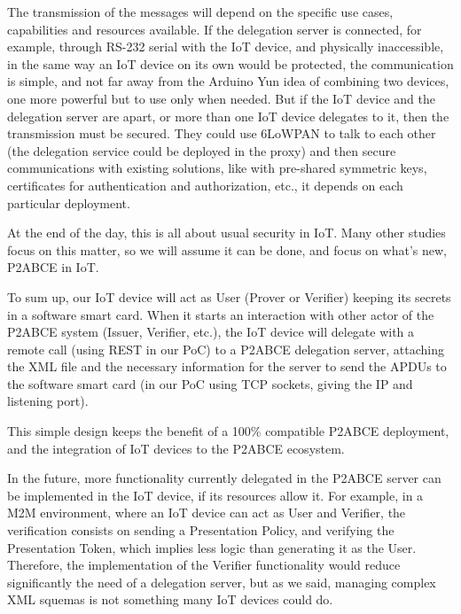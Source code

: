The transmission of the messages will depend on the specific use cases, capabilities and resources available. If the delegation server is connected, for example, through RS-232 serial with the IoT device, and physically inaccessible, in the same way an IoT device on its own would be protected, the communication is simple, and not far away from the Arduino Yun idea of combining two devices, one more powerful but to use only when needed. But if the IoT device and the delegation server are apart, or more than one IoT device delegates to it, then the transmission must be secured. They could use 6LoWPAN to talk to each other (the delegation service could be deployed in the proxy) and then secure communications with existing solutions, like with pre-shared symmetric keys, certificates for authentication and authorization, etc., it depends on each particular deployment.

At the end of the day, this is all about usual security in IoT. Many other studies focus on this matter, so we will assume it can be done, and focus on what's new, P2ABCE in IoT.


\hfil




To sum up, our IoT device will act as User (Prover or Verifier) keeping its secrets in a software smart card. When it starts an interaction with other actor of the P2ABCE system (Issuer, Verifier, etc.), the IoT device will delegate with a remote call (using REST in our PoC) to a P2ABCE delegation server, attaching the XML file and the necessary information for the server to send the APDUs to the software smart card (in our PoC using TCP sockets, giving the IP and listening port).



\hfil


This simple design keeps the benefit of a 100\% compatible P2ABCE deployment, and the integration of IoT devices to the P2ABCE ecosystem.

In the future, more functionality currently delegated in the P2ABCE server can be implemented in the IoT device, if its resources allow it. For example, in a M2M environment, where an IoT device can act as User and Verifier, the verification consists on sending a Presentation Policy, and verifying the Presentation Token, which implies less logic than generating it as the User. Therefore, the implementation of the Verifier functionality would reduce significantly the need of a delegation server, but as we said, managing complex XML squemas is not something many IoT devices could do.






